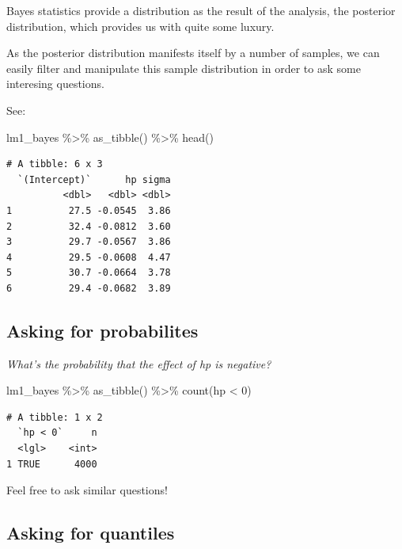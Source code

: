 \documentclass[
  letterpaper,
  DIV=11,
  numbers=noendperiod]{scrreprt}
\newenvironment{Shaded}{\begin{snugshade}}{\end{snugshade}}
\newcommand{\DecValTok}[1]{\textcolor[rgb]{0.68,0.00,0.00}{#1}}
\newcommand{\FunctionTok}[1]{\textcolor[rgb]{0.28,0.35,0.67}{#1}}
\newcommand{\NormalTok}[1]{\textcolor[rgb]{0.00,0.23,0.31}{#1}}
\newcommand{\SpecialCharTok}[1]{\textcolor[rgb]{0.37,0.37,0.37}{#1}}
\theoremstyle{definition}
\theoremstyle{definition}
\theoremstyle{remark}
\begin{document}
Bayes statistics provide a distribution as the result of the analysis,
the posterior distribution, which provides us with quite some luxury.

As the posterior distribution manifests itself by a number of samples,
we can easily filter and manipulate this sample distribution in order to
ask some interesing questions.

See:

\begin{Shaded}
\begin{Highlighting}[]
\NormalTok{lm1\_bayes }\SpecialCharTok{\%\textgreater{}\%} 
  \FunctionTok{as\_tibble}\NormalTok{() }\SpecialCharTok{\%\textgreater{}\%} 
  \FunctionTok{head}\NormalTok{()}
\end{Highlighting}
\end{Shaded}

\begin{verbatim}
# A tibble: 6 x 3
  `(Intercept)`      hp sigma
          <dbl>   <dbl> <dbl>
1          27.5 -0.0545  3.86
2          32.4 -0.0812  3.60
3          29.7 -0.0567  3.86
4          29.5 -0.0608  4.47
5          30.7 -0.0664  3.78
6          29.4 -0.0682  3.89
\end{verbatim}

\hypertarget{asking-for-probabilites}{%
\subsection{Asking for probabilites}\label{asking-for-probabilites}}

\emph{What's the probability that the effect of hp is negative?}

\begin{Shaded}
\begin{Highlighting}[]
\NormalTok{lm1\_bayes }\SpecialCharTok{\%\textgreater{}\%} 
  \FunctionTok{as\_tibble}\NormalTok{() }\SpecialCharTok{\%\textgreater{}\%} 
  \FunctionTok{count}\NormalTok{(hp }\SpecialCharTok{\textless{}} \DecValTok{0}\NormalTok{)}
\end{Highlighting}
\end{Shaded}

\begin{verbatim}
# A tibble: 1 x 2
  `hp < 0`     n
  <lgl>    <int>
1 TRUE      4000
\end{verbatim}

Feel free to ask similar questions!

\hypertarget{asking-for-quantiles}{%
\subsection{Asking for quantiles}\label{asking-for-quantiles}}
\end{document}
